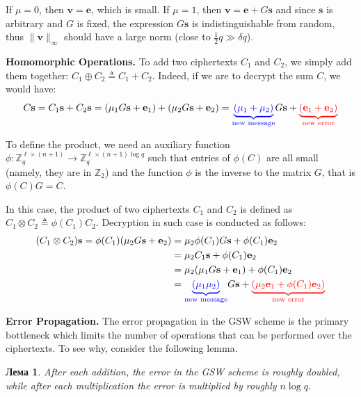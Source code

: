 \documentclass[12pt,a4paper,oneside]{book}
\theoremstyle{dplplain}
\newtheorem{lemma}[theorem]{Лема}%
\theoremstyle{dpldefinition}
\theoremstyle{dplremark}
\begin{document}
If $\mu=0$, then $\mathbf{v} = \mathbf{e}$, which is small. If $\mu=1$, then
$\mathbf{v} = \mathbf{e} + G\mathbf{s}$ and since $\mathbf{s}$ is arbitrary and
$G$ is fixed, the expression $G\mathbf{s}$ is indistinguishable from random,
thus $\|\mathbf{v}\|_{\infty}$ should have a large norm (close to
$\frac{1}{2}q \gg \delta q$).

\textbf{Homomorphic Operations.} To add two ciphertexts $C_1$ and $C_2$, we
simply add them together: $C_1 \oplus C_2 \triangleq C_1 + C_2$. Indeed, if we are to 
decrypt the sum $C$, we would have:
\begin{equation*}
    C\mathbf{s} = C_1\mathbf{s} + C_2\mathbf{s} = (\mu_1 G\mathbf{s}+\mathbf{e}_1) + (\mu_2 G\mathbf{s} + \mathbf{e}_2)
    = \textcolor{blue}{\underbrace{(\mu_1+\mu_2)}_{\text{new message}}}G\mathbf{s} + \textcolor{red}{\underbrace{(\mathbf{e}_1+\mathbf{e}_2)}_{\text{new error}}}
\end{equation*}

To define the product, we need an auxiliary function $\phi: \mathbb{Z}_q^{\ell
\times (n+1)} \to \mathbb{Z}_q^{\ell \times (n+1)\log q}$ such that entries of 
$\phi(C)$ are all small (namely, they are in $\mathbb{Z}_2$) and the function 
$\phi$ is the inverse to the matrix $G$, that is $\phi(C)G=C$. 

In this case, the product of two ciphertexts $C_1$ and $C_2$ is defined as $C_1
\otimes C_2 \triangleq \phi(C_1)C_2$. Decryption in such case is conducted as follows:
\begin{align*}
    (C_1 \otimes C_2)\mathbf{s} = \phi(C_1)(\mu_2 G\mathbf{s} + \mathbf{e}_2) &= \mu_2 \phi(C_1)G\mathbf{s} + \phi(C_1)\mathbf{e}_2 \\
    &= \mu_2C_1 \mathbf{s} + \phi(C_1)\mathbf{e}_2 \\
    &= \mu_2(\mu_1 G\mathbf{s} + \mathbf{e}_1) + \phi(C_1)\mathbf{e}_2\\
    &= \textcolor{blue}{\underbrace{(\mu_1\mu_2)}_{\text{new message}}}G\mathbf{s} + 
    \textcolor{red}{\underbrace{(\mu_2\mathbf{e}_1 + \phi(C_1)\mathbf{e}_2)}_{\text{new error}}}
\end{align*}

\textbf{Error Propagation.} The error propagation in the GSW scheme is the
primary bottleneck which limits the number of operations that can be performed
over the ciphertexts. To see why, consider the following lemma.

\begin{lemma}
    After each addition, the error in the GSW scheme is roughly doubled, while
    after each multiplication the error is multiplied by roughly $n\log q$. 
\end{lemma}
\end{document}
